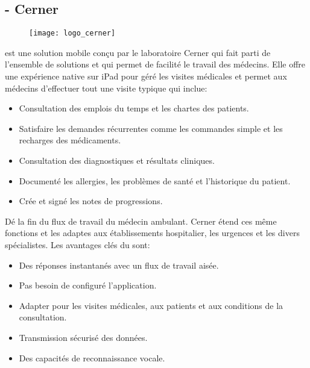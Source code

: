 \subsection{\pct{} - Cerner}

\begin{figure}[H]
\centering
\texttt{[image: logo\_cerner]}
\end{figure}

\pct{} est une solution mobile conçu par le laboratoire Cerner qui
fait parti de l'ensemble de solutions  et qui permet de
facilité le travail des médecins. Elle offre une expérience native
sur iPad pour géré les visites médicales et permet aux médecins
d'effectuer tout une visite typique qui inclue:~\cite{pct:flyer}

\begin{itemize}

\item Consultation des emplois du temps et les chartes des patients.

\item Satisfaire les demandes récurrentes comme les commandes simple
et les recharges des médicaments.

\item Consultation des diagnostiques et résultats cliniques.

\item Documenté les allergies, les problèmes de santé et l'historique
du patient.

\item Crée et signé les notes de progressions.

\end{itemize}

Dé la fin du flux de travail du médecin ambulant. Cerner étend ces
même fonctions et les adaptes aux établissements hospitalier, les
urgences et les divers spécialistes.
Les avantages clés du \pct{} sont:~\cite{pct:flyer}

\begin{itemize}

\item Des réponses instantanés avec un flux de travail aisée.

\item Pas besoin de configuré l'application.

\item Adapter pour les visites médicales, aux patients et aux conditions
de la consultation.

\item Transmission sécurisé des données.

\item Des capacités de reconnaissance vocale.

\end{itemize}

